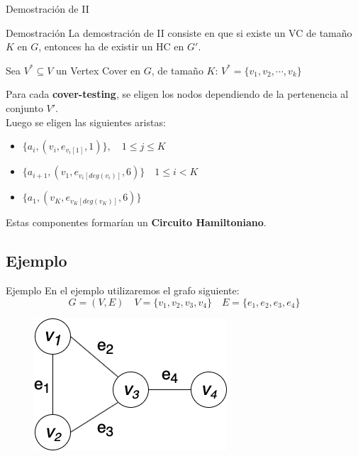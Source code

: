 \documentclass{beamer}
\begin{document}
\begin{frame}{Demostración de II}
    \begin{block}{Demostración}
        La demostración de II consiste en que si existe un VC de tamaño $K$ en $G$, 
        entonces ha de existir un HC en $G'$.
    \end{block}
    Sea $V^* \subseteq V$ un Vertex Cover en $G$, de tamaño $K$: $V^* = \{v_1,v_2, \cdots, v_k \}$\\
    \begin{block}{}
        Para cada \textbf{cover-testing}, se eligen los nodos dependiendo de la pertenencia al conjunto $V'$.\\
        Luego se eligen las siguientes aristas:
        \begin{itemize}
            \item $\{a_i, (v_i, e_{v_i[1]}, 1)\}, \quad 1 \le j \le K$
            \item $\{a_{i+1}, (v_1, e_{v_i[deg(v_i)]}, 6)\} \quad 1 \le i < K$
            \item $\{a_1, (v_K, e_{v_K[deg(v_K)]}, 6)\}$
        \end{itemize}
    \end{block}
    \begin{block}{}
        \begin{center}
            Estas componentes formarían un \textbf{Circuito Hamiltoniano}.
        \end{center}
    \end{block}
\end{frame}

\subsection{Ejemplo}
\begin{frame}{Ejemplo}
    En el ejemplo utilizaremos el grafo siguiente:
    \[G = (V, E) \quad V = \{v_1, v_2, v_3, v_4\} \quad E = \{e_1, e_2, e_3, e_4\}\]
    \begin{figure}
        \centering
        \includegraphics[scale=0.6]{images/example-1.png}
        \label{fig:my_label}
    \end{figure}
\end{frame}
\end{document}
